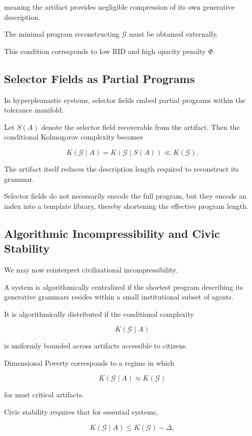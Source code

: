 \documentclass[11pt]{article}
\begin{document}
meaning the artifact provides negligible compression of its
own generative description.

The minimal program reconstructing $\mathcal{G}$ must be obtained
externally.

This condition corresponds to low RID and high opacity penalty $\Phi$.

\subsection{Selector Fields as Partial Programs}

In hyperpleonastic systems, selector fields embed partial programs
within the tolerance manifold.

Let $S(A)$ denote the selector field recoverable from the artifact.
Then the conditional Kolmogorov complexity becomes

\[
K(\mathcal{G} \mid A) = K(\mathcal{G} \mid S(A)) \ll K(\mathcal{G}).
\]

The artifact itself reduces the description length required to
reconstruct its grammar.

Selector fields do not necessarily encode the full program,
but they encode an index into a template library,
thereby shortening the effective program length.

\subsection{Algorithmic Incompressibility and Civic Stability}

We may now reinterpret civilizational incompressibility.

A system is algorithmically centralized if the shortest program
describing its generative grammars resides within a small
institutional subset of agents.

It is algorithmically distributed if the conditional complexity

\[
K(\mathcal{G} \mid A)
\]

is uniformly bounded across artifacts accessible to citizens.

Dimensional Poverty corresponds to a regime in which

\[
K(\mathcal{G} \mid A) \approx K(\mathcal{G})
\]

for most critical artifacts.

Civic stability requires that for essential systems,

\[
K(\mathcal{G} \mid A) \leq K(\mathcal{G}) - \Delta,
\]
\end{document}
